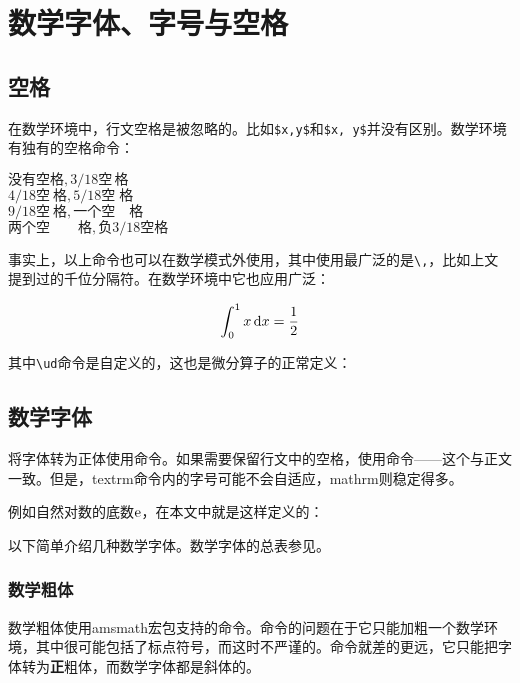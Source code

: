 {\section{数学字体、字号与空格}
\label{sec:mathfont}
\subsection{空格}
在数学环境中，行文空格是被忽略的。比如\verb|$x,y$|和\verb|$x, y$|并没有区别。数学环境有独有的空格命令：

\begin{codeshow}
  $没有空格,3/18空\,格$ \\
  $4/18空\:格,5/18空\;格$ \\
  $9/18空\ 格,一个空\quad 格$ \\
  $两个空\qquad 格,负3/18空\!格$
\end{codeshow}

事实上，以上命令也可以在数学模式外使用，其中使用最广泛的是\verb|\,|，比如上文提到过的千位分隔符。在数学环境中它也应用广泛：

\begin{codeshow}
\[ \int_0^1 x \ud{}x
= \frac{1}{2} \]
\end{codeshow}

其中\verb|\ud|命令是自定义的，这也是微分算子的正常定义\label{cmd:ud}：
\begin{latex}{}
\newcommand{\ud}{\mathop{}\negthinspace\mathrm{d}}
\end{latex}

\subsection{数学字体}
将字体转为正体使用\latexline{\\mathrm}命令。如果需要保留行文中的空格，使用\latexline{\\textrm}命令——这个与正文一致。但是，textrm命令内的字号可能不会自适应，mathrm则稳定得多。

例如自然对数的底数$\ue$，在本文中就是这样定义的：
\begin{latex}{}
\newcommand{\ue}{\mathrm{e}}
\end{latex}

以下简单介绍几种数学字体。数学字体的总表参见。

\subsubsection{数学粗体}
数学粗体使用amsmath宏包支持的\latexline{\\boldsymbol}命令。命令\latexline{\\boldmath}的问题在于它只能加粗一个数学环境，其中很可能包括了标点符号，而这时不严谨的。命令\latexline{\\mathbf}就差的更远，它只能把字体转为\textbf{正}粗体，而数学字体都是斜体的。

}
